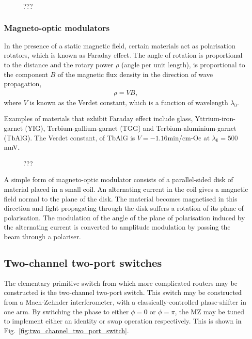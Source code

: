 \begin{figure}[!htbp]
\caption{???}
\end{figure}

%
%

\subsubsection{Magneto-optic modulators} 

In the presence of a static magnetic field, certain materials act as polarisation rotators, which is known as Faraday effect. The angle of rotation is proportional to the distance and the rotary power $\rho$ (angle per unit length), is proportional to the component $B$ of the magnetic flux density in the direction of wave propagation,
\begin{align}
	\rho=VB,
\end{align}
where $V$ is known as the Verdet constant, which is a function of wavelength $\lambda_0$.
 
Examples of materials that exhibit Faraday effect include glass, Yttrium-iron-garnet (YIG), Terbium-gallium-garnet (TGG) and Terbium-aluminium-garnet (TbAlG). The Verdet constant, of TbAlG is $V=-1.16$min/cm-Oe  at $\lambda_0=500$nmV.

\begin{figure}[!htbp]
\caption{???}
\end{figure}

A simple form of magneto-optic modulator consists of a parallel-sided disk of material placed in a small coil. An alternating current in the coil gives a magnetic field normal to the plane of the disk. The material becomes magnetised in this direction and light propagating through the disk suffers a rotation of its plane of polarisation. The modulation of the angle of the plane of polarisation induced by the alternating current is converted to amplitude modulation by passing the beam through a polariser. 

%
%

\subsection{Two-channel two-port switches} 

The elementary primitive switch from which more complicated routers may be constructed is the two-channel two-port switch. This switch may be constructed from a Mach-Zehnder interferometer, with a classically-controlled phase-shifter in one arm. By switching the phase to either \mbox{$\phi=0$} or \mbox{$\phi=\pi$}, the MZ may be tuned to implement either an identity or swap operation respectively. This is shown in Fig.~\ref{fig:two_channel_two_port_switch}.

